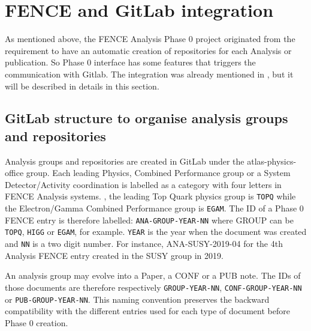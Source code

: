 
\section{FENCE and GitLab integration}%
\label{sec:FENCE_and_Gitlab_integration}

As mentioned above, the FENCE Analysis Phase 0 project originated from the requirement to have an automatic creation of  repositories for each Analysis or publication. So Phase 0 interface has some features that triggers the communication with Gitlab. The integration was already mentioned in , but it will be described in details in this section.

\subsection{GitLab structure to organise analysis groups and repositories}%
\label{sec:Gitlab_structure_to_organise_Analysis_groups_and_repositories}

Analysis groups and repositories are created in GitLab under the atlas-physics-office group. Each leading Physics, Combined Performance group or a System Detector/Activity coordination is labelled as a category with four letters in FENCE Analysis systems.
, the leading Top Quark physics group is \texttt{TOPQ} while the Electron/Gamma Combined Performance group is \texttt{EGAM}.
The ID of a Phase 0 FENCE entry is therefore labelled: \texttt{ANA-GROUP-YEAR-NN} where GROUP can be \texttt{TOPQ}, \texttt{HIGG} or \texttt{EGAM}, for example.
\texttt{YEAR} is the year when the document was created and \texttt{NN} is a two digit number.
For instance, ANA-SUSY-2019-04 for the 4th Analysis FENCE entry created in the SUSY group in 2019.

An analysis group may evolve into a Paper, a CONF or a PUB note. The IDs of those documents are therefore respectively \texttt{GROUP-YEAR-NN}, \texttt{CONF-GROUP-YEAR-NN} or \texttt{PUB-GROUP-YEAR-NN}.
This naming convention preserves the backward compatibility with the different entries used for each type of document before Phase 0 creation.

